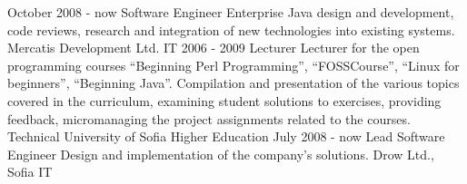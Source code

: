 
{
  October 2008 - now
}
{
  Software Engineer
}
{
  Enterprise Java design and development, code reviews, research and
  integration of new technologies into existing systems.
}
{
  Mercatis Development Ltd.
}
{
  IT
}
{
  2006 - 2009
}
{
  Lecturer
}
{
  Lecturer for the open programming courses
  ``Beginning Perl Programming'', ``FOSSCourse'', ``Linux for
  beginners'', ``Beginning Java''. Compilation and presentation of the various topics covered in
  the curriculum, examining student solutions to exercises, providing
  feedback, micromanaging the project assignments related to the courses.
}
{
  Technical University of Sofia
}
{
  Higher Education
}
\ecvitem{}{} %
\ecvitem{}{} %
{
  July 2008 - now
}
{
  Lead Software Engineer
}
{
  Design and implementation of the company's solutions.
}
{
  Drow Ltd., Sofia
}
{
  IT
}

